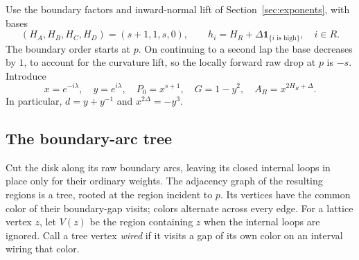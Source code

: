Use the boundary factors and inward-normal lift of
Section~\ref{sec:exponents}, with bases
\begin{equation}
 (H_A,H_B,H_C,H_D)=(s+1,1,s,0),\qquad
 h_i=H_R+\Delta\mathbf1_{\{i\text{ is high}\}},\quad i\in R.
 \label{four:bases}
\end{equation}
The boundary order starts at $p$.  On continuing to a second lap the
base decreases by $1$, to account for the curvature lift, so the locally
forward raw drop at $p$ is $-s$.  Introduce
\begin{equation}
 x=e^{-i\lambda},\quad y=e^{i\lambda},\quad
 P_0=x^{s+1},\quad G=1-y^2,\quad A_R=x^{2H_R+\Delta}.
 \label{four:normalization}
\end{equation}
In particular, $d=y+y^{-1}$ and $x^{2\Delta}=-y^3$.

\subsection{The boundary-arc tree}

Cut the disk along its raw boundary arcs, leaving its closed internal
loops in place only for their ordinary weights.  The adjacency graph of
the resulting regions is a tree, rooted at the region incident to $p$.
Its vertices have the common color of their boundary-gap visits; colors
alternate across every edge.  For a lattice vertex $z$, let $V(z)$ be
the region containing $z$
when the internal loops are ignored.  Call a tree vertex \emph{wired}
if it visits a gap of its own color on an interval wiring that color.

